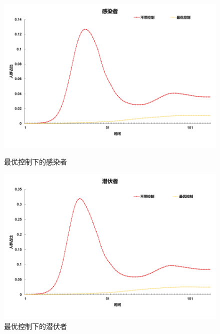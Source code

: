 \begin{figure}[htbp]
	\centering
	\begin{minipage}{0.49\linewidth}
		\centering
		\includegraphics[width=0.9\linewidth]{fig/image002.png}
		\caption{最优控制下的感染者}
		\label{fig:ima1}%
	\end{minipage}
	\begin{minipage}{0.49\linewidth}
		\centering
		\includegraphics[width=0.9\linewidth]{fig/image010.png}
		\caption{最优控制下的潜伏者}
		\label{fig:ima2}%
	\end{minipage}
	

\end{figure}
